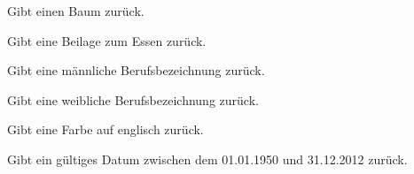 \documentclass[a4paper,12pt,oneside]{sphinxmanual}
\begin{document}

\begin{fulllineitems}
\label{module:pyzufall.generator.baum}
Gibt einen Baum zurück.

\end{fulllineitems}


\begin{fulllineitems}
\label{module:pyzufall.generator.beilage}
Gibt eine Beilage zum Essen zurück.

\end{fulllineitems}


\begin{fulllineitems}
\label{module:pyzufall.generator.beruf_m}
Gibt eine männliche Berufsbezeichnung zurück.

\end{fulllineitems}


\begin{fulllineitems}
\label{module:pyzufall.generator.beruf_w}
Gibt eine weibliche Berufsbezeichnung zurück.

\end{fulllineitems}


\begin{fulllineitems}
\label{module:pyzufall.generator.color}
Gibt eine Farbe auf englisch zurück.

\end{fulllineitems}


\begin{fulllineitems}
\label{module:pyzufall.generator.datum}
Gibt ein gültiges Datum zwischen dem 01.01.1950 und 31.12.2012 zurück.

\end{fulllineitems}
\end{document}
